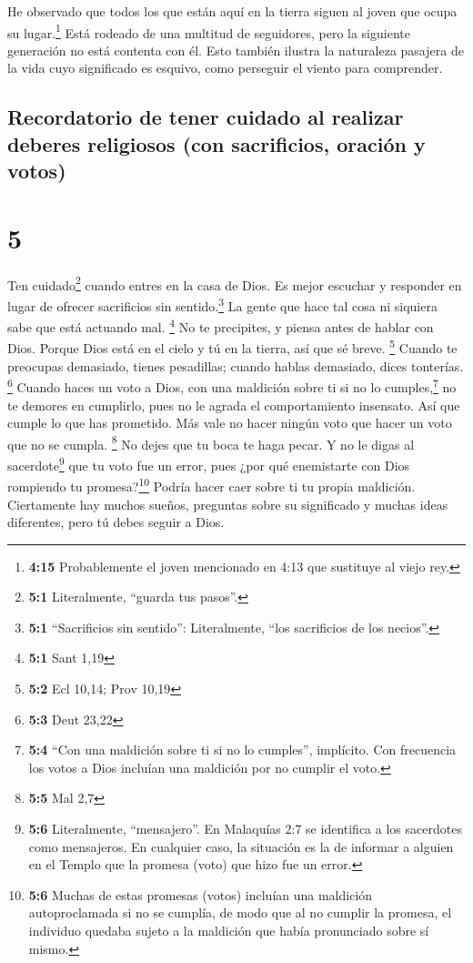  He observado que todos los que están aquí en la tierra
siguen al joven que ocupa su lugar.\footnote{\textbf{4:15} Probablemente
  el joven mencionado en 4:13 que sustituye al viejo rey.}
 Está rodeado de una multitud de seguidores, pero la
siguiente generación no está contenta con él. Esto también ilustra la
naturaleza pasajera de la vida cuyo significado es esquivo, como
perseguir el viento para comprender.

\hypertarget{recordatorio-de-tener-cuidado-al-realizar-deberes-religiosos-con-sacrificios-oraciuxf3n-y-votos}{%
\subsection{Recordatorio de tener cuidado al realizar deberes religiosos
(con sacrificios, oración y
votos)}\label{recordatorio-de-tener-cuidado-al-realizar-deberes-religiosos-con-sacrificios-oraciuxf3n-y-votos}}

\hypertarget{section-4}{%
\section{5}\label{section-4}}

 Ten cuidado\footnote{\textbf{5:1} Literalmente, ``guarda
  tus pasos''.} cuando entres en la casa de Dios. Es mejor escuchar y
responder en lugar de ofrecer sacrificios sin sentido.\footnote{\textbf{5:1}
  ``Sacrificios sin sentido'': Literalmente, ``los sacrificios de los
  necios''.} La gente que hace tal cosa ni siquiera sabe que está
actuando mal. \footnote{\textbf{5:1} Sant 1,19}  No te
precipites, y piensa antes de hablar con Dios. Porque Dios está en el
cielo y tú en la tierra, así que sé breve. \footnote{\textbf{5:2} Ecl
  10,14; Prov 10,19}  Cuando te preocupas demasiado,
tienes pesadillas; cuando hablas demasiado, dices tonterías. \footnote{\textbf{5:3}
  Deut 23,22}  Cuando haces un voto a Dios, con una
maldición sobre ti si no lo cumples,\footnote{\textbf{5:4} ``Con una
  maldición sobre ti si no lo cumples'', implícito. Con frecuencia los
  votos a Dios incluían una maldición por no cumplir el voto.} no te
demores en cumplirlo, pues no le agrada el comportamiento insensato. Así
que cumple lo que has prometido.  Más vale no hacer ningún
voto que hacer un voto que no se cumpla. \footnote{\textbf{5:5} Mal 2,7}
 No dejes que tu boca te haga pecar. Y no le digas al
sacerdote\footnote{\textbf{5:6} Literalmente, ``mensajero''. En
  Malaquías 2:7 se identifica a los sacerdotes como mensajeros. En
  cualquier caso, la situación es la de informar a alguien en el Templo
  que la promesa (voto) que hizo fue un error.} que tu voto fue un
error, pues ¿por qué enemistarte con Dios rompiendo tu
promesa?\footnote{\textbf{5:6} Muchas de estas promesas (votos) incluían
  una maldición autoproclamada si no se cumplía, de modo que al no
  cumplir la promesa, el individuo quedaba sujeto a la maldición que
  había pronunciado sobre sí mismo.} Podría hacer caer sobre ti tu
propia maldición.  Ciertamente hay muchos sueños,
preguntas sobre su significado y muchas ideas diferentes, pero tú debes
seguir a Dios.

